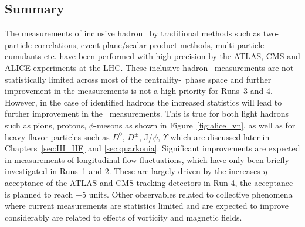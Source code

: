 \subsection{Summary}
The measurements of inclusive hadron \vn\ by traditional methods such as 
  two-particle correlations, event-plane/scalar-product methods, 
  multi-particle cumulants etc. have been performed with high precision 
  by the ATLAS, CMS and ALICE experiments at the LHC.
These inclusive hadron \vn\ measurements are not statistically limited 
  across most of the centrality-\pt\ phase space and further improvement 
  in the measurements is not a high priority for Runs~3 and 4.
However, in the case of identified hadrons the increased statistics 
  will lead to further improvement in the \vn\ measurements.
This is true for both light hadrons such as pions, protons, $\phi$-mesons 
  as shown in Figure~\ref{fig:alice_vn}, as well as for heavy-flavor 
  particles such as $D^0$, $D^{\pm}$, J/$\psi$, $\Upsilon$ which are 
  discussed later in Chapters~\ref{sec:HI_HF} and \ref{sec:quarkonia}.
Significant improvements are expected in measurements of 
  longitudinal flow fluctuations, which have only been briefly investigated
  in Runs~1 and 2.
These are largely driven by the increases $\eta$ acceptance of the
  ATLAS and CMS tracking detectors in Run-4, the acceptance is planned 
  to reach $\pm$5 units.
Other observables related to collective phenomena where current 
  measurements are statistics limited and are expected to improve 
  considerably are related to effects of vorticity and magnetic fields.

